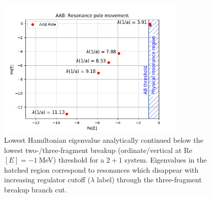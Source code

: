 \documentclass[preprint,12pt]{elsarticle}
\begin{document}
\begin{figure}[h] 
\centering 
\includegraphics[width=0.8\textwidth]{./AAB_resonance_run.png} 
\caption{Lowest Hamiltonian eigenvalue analytically continued below the lowest
two-/three-fragment breakup (ordinate/vertical at Re$[E]=-1~$MeV) threshold
for a $2+1$ system. Eigenvalues in the hatched region correspond to resonances
which disappear with increasing regulator cutoff ($\lambda$ label) through the
three-fragment breakup branch cut.}
\label{fig:poletrajectory}
\end{figure}
\end{document}
